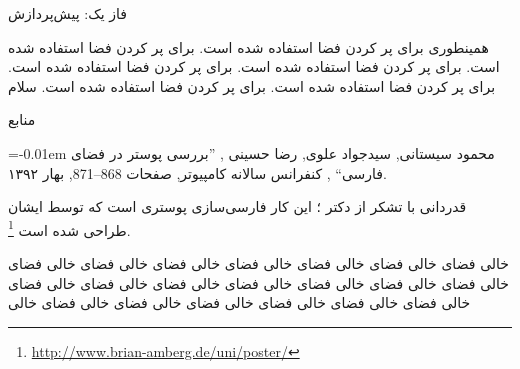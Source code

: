 \documentclass[debug,a0paper,portrait,persian]{xebaposter}
\begin{document}
\begin{poster}
\begin{posterbox}[name=phase1,column=0,span=1,below=imagedataset]{فاز یک{:} پیش‌پردازش}
\ptext[16-17]
\end{posterbox}
\begin{posterbox}[name=adhoc,column=0,span=1,below=phase1]{همینطوری}
{برای پر کردن فضا استفاده شده است. برای پر کردن فضا استفاده شده است. برای پر کردن فضا استفاده شده است. 
برای پر کردن فضا استفاده شده است. برای پر کردن فضا استفاده شده است. برای پر کردن فضا استفاده شده است. 
سلام}
\end{posterbox}
\begin{posterbox}[name=references,column=1,span=2,below=results]{منابع}
     \smaller
%     
     \renewcommand{\section}[2]{\vskip 0.05em}
       \begin{thebibliography}{1}\itemsep=-0.01em
       \setlength{\baselineskip}{0.4em}
       \bibitem{}
       محمود سیستانی, سیدجواد علوی, رضا حسینی
	, ''بررسی پوستر در فضای فارسی``
	, کنفرانس سالانه کامپیوتر, صفحات 868--871, بهار ۱۳۹۲.
       \end{thebibliography}
\end{posterbox}
\begin{posterbox}[name=ack,column=0,span=2,below=references]{قدردانی}
با تشکر از دکتر ؛ این کار فارسی‌سازی پوستری است که توسط ایشان طراحی شده است%
\footnote{\href{https://web.archive.org/web/20230912095502/http://www.brian-amberg.de/uni/poster/}{http://www.brian-amberg.de/uni/poster/}}.
\end{posterbox}
\begin{posterbox}[name=ack,column=2,span=1,below=references]{خالی}
فضای خالی فضای خالی فضای خالی فضای خالی فضای خالی فضای خالی فضای خالی فضای خالی فضای خالی فضای خالی 
فضای خالی فضای خالی فضای خالی فضای خالی فضای خالی فضای خالی فضای خالی فضای خالی فضای خالی فضای خالی 
\end{posterbox}%
\end{poster}
\end{document}
